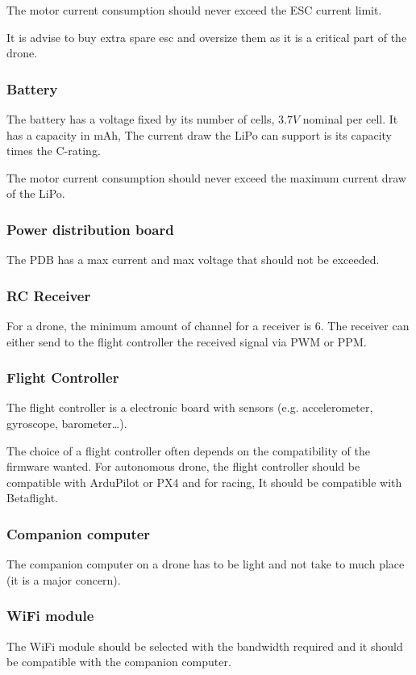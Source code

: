 The motor current consumption should never exceed the ESC current limit.

It is advise to buy extra spare esc and oversize them as it is a critical part of the drone.

\subsubsection{Battery}
The battery has a voltage fixed by its number of cells, $3.7V$ nominal per cell.
It has a capacity in mAh,
The current draw the LiPo can support is its capacity times the C-rating.

The motor current consumption should never exceed the maximum current draw of the LiPo.

\subsubsection{Power distribution board}
The PDB has a max current and max voltage that should not be exceeded.

\subsubsection{RC Receiver}
For a drone, the minimum amount of channel for a receiver is 6.
The receiver can either send to the flight controller the received signal via PWM or PPM.

\subsubsection{Flight Controller}
The flight controller is a electronic board with sensors (e.g. accelerometer, gyroscope, barometer…).

The choice of a flight controller often depends on the compatibility of the firmware wanted. For autonomous drone, the flight controller should be compatible with ArduPilot or PX4 and for racing, It should be compatible with Betaflight.

\subsubsection{Companion computer}
The companion computer on a drone has to be light and not take to much place (it is a major concern).

\subsubsection{WiFi module}
The WiFi module should be selected with the bandwidth required and it should be compatible with the companion computer.

